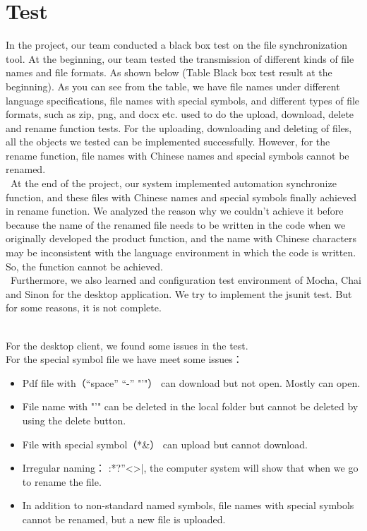 
\section{Test}

In the project, our team conducted a black box test on the file synchronization tool. At the beginning, our team tested the transmission of different kinds of file names and file formats. As shown below (Table Black box test result at the beginning). As you can see from the table, we have file names under different language specifications, file names with special symbols, and different types of file formats, such as zip, png, and docx etc. used to do the upload, download, delete and rename function tests. For the uploading, downloading and deleting of files, all the objects we tested can be implemented successfully. However, for the rename function, file names with Chinese names and special symbols cannot be renamed. \\\
At the end of the project, our system implemented automation synchronize function, and these files with Chinese names and special symbols finally achieved in rename function. We analyzed the reason why we couldn't achieve it before because the name of the renamed file needs to be written in the code when we originally developed the product function, and the name with Chinese characters may be inconsistent with the language environment in which the code is written. So, the function cannot be achieved.\\\
Furthermore, we also learned and configuration test environment of Mocha, Chai and Sinon for the desktop application. We try to implement the jsunit test. But for some reasons, it is not complete.\\\

For the desktop client, we found some issues in the test.\\
For the special symbol file we have meet some issues：\\
\begin{itemize}
\item{Pdf file with（“space” “-” "'"） can download but not open. Mostly can open.}
\item{ File name with "'" can be deleted in the local folder but cannot be deleted by using the delete button.}
\item{File with special symbol（*&） can upload but cannot download.}
\item{Irregular naming： \/:*?”<>|, the computer system will show that when we go to rename the file.}
\item{In addition to non-standard named symbols, file names with special symbols cannot be renamed, but a new file is uploaded.}
\end{itemize}

